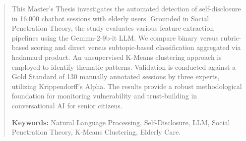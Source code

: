 \begin{abstract}
This Master’s Thesis investigates the automated detection of self-disclosure in 16,000 chatbot sessions with elderly users. Grounded in Social Penetration Theory, the study evaluates various feature extraction pipelines using the Gemma-2-9b-it LLM. We compare binary versus rubric-based scoring and direct versus \gls{subtopic}-based classification aggregated via \gls{hadamard} product. An unsupervised K-Means clustering approach is employed to identify thematic patterns. Validation is conducted against a Gold Standard of 130 manually annotated sessions by three experts, utilizing Krippendorff’s Alpha. The results provide a robust methodological foundation for monitoring vulnerability and trust-building in conversational AI for senior citizens.

\vspace{0.5cm}
\noindent \textbf{Keywords:} Natural Language Processing, Self-Disclosure, LLM, Social Penetration Theory, K-Means Clustering, Elderly Care.
\end{abstract}
\newpage